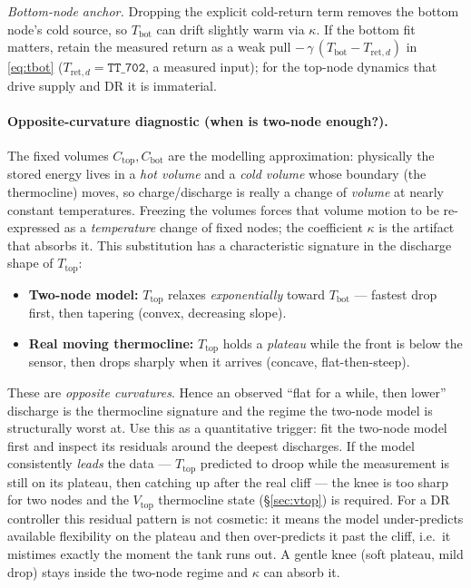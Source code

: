\documentclass[11pt,a4paper]{article}
\newcommand{\Ttop}{T_{\mathrm{top}}}
\newcommand{\Tbot}{T_{\mathrm{bot}}}
\newcommand{\Tretd}{T_{\mathrm{ret},d}}
\newcommand{\Vtop}{V_{\mathrm{top}}}
\newcommand{\code}[1]{\texttt{#1}}
\begin{document}
\emph{Bottom-node anchor.} Dropping the explicit cold-return term removes the bottom
node's cold source, so $\Tbot$ can drift slightly warm via $\kappa$. If the bottom
fit matters, retain the measured return as a weak pull $-\,\gamma\,(\Tbot-\Tretd)$ in
\eqref{eq:tbot} ($\Tretd=\code{TT\_702}$, a measured input); for the top-node dynamics
that drive supply and DR it is immaterial.

\paragraph{Opposite-curvature diagnostic (when is two-node enough?).}
The fixed volumes $C_{\mathrm{top}},C_{\mathrm{bot}}$ are the modelling
approximation: physically the stored energy lives in a \emph{hot volume} and a
\emph{cold volume} whose boundary (the thermocline) moves, so charge/discharge is
really a change of \emph{volume} at nearly constant temperatures. Freezing the
volumes forces that volume motion to be re-expressed as a \emph{temperature} change
of fixed nodes; the coefficient $\kappa$ is the artifact that absorbs it. This
substitution has a characteristic signature in the discharge shape of $\Ttop$:
\begin{itemize}[nosep]
  \item \textbf{Two-node model:} $\Ttop$ relaxes \emph{exponentially} toward
        $\Tbot$ --- fastest drop first, then tapering (convex, decreasing slope).
  \item \textbf{Real moving thermocline:} $\Ttop$ holds a \emph{plateau} while the
        front is below the sensor, then drops sharply when it arrives (concave,
        flat-then-steep).
\end{itemize}
These are \emph{opposite curvatures}. Hence an observed ``flat for a while, then
lower'' discharge is the thermocline signature and the regime the two-node model is
structurally worst at. Use this as a quantitative trigger: fit the two-node model
first and inspect its residuals around the deepest discharges. If the model
consistently \emph{leads} the data --- $\Ttop$ predicted to droop while the
measurement is still on its plateau, then catching up after the real cliff --- the
knee is too sharp for two nodes and the $\Vtop$ thermocline state
(\S\ref{sec:vtop}) is required. For a DR controller this residual pattern is not
cosmetic: it means the model under-predicts available flexibility on the plateau
and then over-predicts it past the cliff, i.e.\ it mistimes exactly the moment the
tank runs out. A gentle knee (soft plateau, mild drop) stays inside the two-node
regime and $\kappa$ can absorb it.
\end{document}
